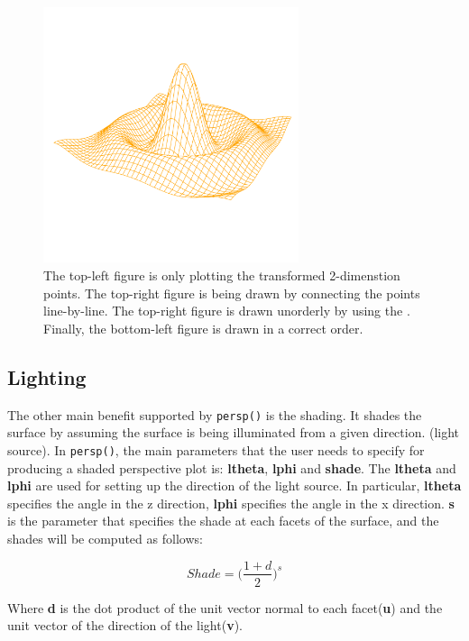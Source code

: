 \documentclass{report}
\begin{document}
\begin{figure}[h]
\begin{center}
		\includegraphics[height = 7.5cm, width = 7.5cm]{figure/standalone_p_4.pdf}
		\caption{The top-left figure is only plotting the transformed 2-dimenstion points. The top-right figure is being drawn by connecting the points line-by-line. The top-right figure is drawn unorderly by using the . Finally, the bottom-left figure is drawn in a correct order.}
		\label{figure_3.2}
	\end{center}
\end{figure}

\subsection{Lighting}
The other main benefit supported by \texttt{persp()} is the shading. It shades the surface by assuming the surface is being illuminated from a given direction. (light source). In \texttt{persp()}, the main parameters that the user needs to specify for producing a shaded perspective plot is: \textbf{ltheta}, \textbf{lphi} and \textbf{shade}. The \textbf{ltheta} and \textbf{lphi} are used for setting up the direction of the light source. In particular, \textbf{ltheta} specifies the angle in the z direction, \textbf{lphi} specifies the angle in the x direction. \textbf{s} is the parameter that specifies the shade at each facets of the surface, and the shades will be computed as follows:

\begin{equation}
Shade = \big(\frac{1 + d}{2}\big)^{s}
\end{equation}

Where \textbf{d} is the dot product of the unit vector normal to each facet(\textbf{u}) and the unit vector of the direction of the light(\textbf{v}). \\
\end{document}
